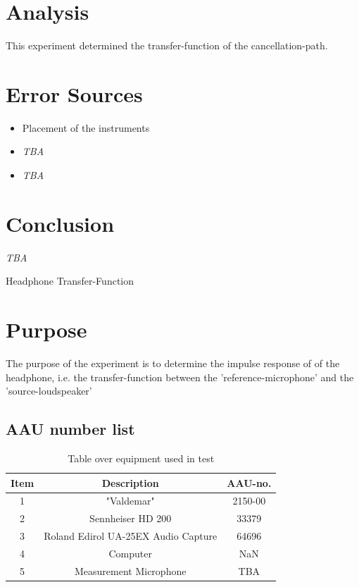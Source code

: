 \documentclass[12pt,a4paper,openright]{article}
\newcommand{\ra}[1]{\renewcommand{\arraystretch}{#1}}
\begin{document}
\section{Analysis}
This experiment determined the transfer-function of the cancellation-path.

\section{Error Sources}
\begin{itemize}
	\item Placement of the instruments
	\item \textit{TBA}
	\item \textit{TBA}
\end{itemize}

\section{Conclusion}
\textit{TBA}
	
	
\pagebreak
\begin{Huge}
\begin{center}
Headphone Transfer-Function
\end{center}
\end{Huge}

\section{Purpose}
The purpose of the experiment is to determine the impulse response of of the  headphone, i.e. the transfer-function between the 'reference-microphone' and the 'source-loudspeaker'

\subsection{AAU number list}
\begin{table}[h]
	\centering
	\ra{1.3}
	\begin{tabular}{ c c c } \toprule
		{Item} & {Description} & {AAU-no.} \\ \bottomrule 
		1      &  "Valdemar"							& 2150-00	\\
		2      &  Sennheiser HD 200						& 33379		\\
		3      &  Roland Edirol UA-25EX Audio Capture	& 64696		\\
		4      &  Computer								& NaN		\\  
		5      &  Measurement Microphone				& TBA		\\ \bottomrule 
	\end{tabular}
	\caption{Table over equipment used in test}
	\label{tab:UsedEquipmentListning2}
\end{table}
\end{document}
